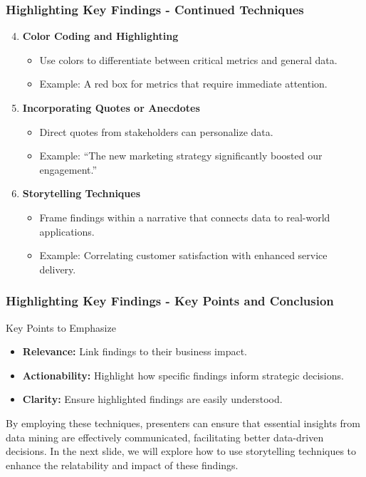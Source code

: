 \documentclass{beamer}
\begin{document}
\begin{frame}[fragile]
    \frametitle{Highlighting Key Findings - Continued Techniques}
    \begin{enumerate}
        \setcounter{enumi}{3}
        \item \textbf{Color Coding and Highlighting}
            \begin{itemize}
                \item Use colors to differentiate between critical metrics and general data.
                \item Example: A red box for metrics that require immediate attention.
            \end{itemize}
        
        \item \textbf{Incorporating Quotes or Anecdotes}
            \begin{itemize}
                \item Direct quotes from stakeholders can personalize data.
                \item Example: “The new marketing strategy significantly boosted our engagement.”
            \end{itemize}
        
        \item \textbf{Storytelling Techniques}
            \begin{itemize}
                \item Frame findings within a narrative that connects data to real-world applications.
                \item Example: Correlating customer satisfaction with enhanced service delivery.
            \end{itemize}
    \end{enumerate}
\end{frame}

\begin{frame}[fragile]
    \frametitle{Highlighting Key Findings - Key Points and Conclusion}
    \begin{block}{Key Points to Emphasize}
        \begin{itemize}
            \item \textbf{Relevance:} Link findings to their business impact.
            \item \textbf{Actionability:} Highlight how specific findings inform strategic decisions.
            \item \textbf{Clarity:} Ensure highlighted findings are easily understood.
        \end{itemize}
    \end{block}
    
    By employing these techniques, presenters can ensure that essential insights from data mining are effectively communicated, facilitating better data-driven decisions. 
    In the next slide, we will explore how to use storytelling techniques to enhance the relatability and impact of these findings.
\end{frame}
\end{document}
